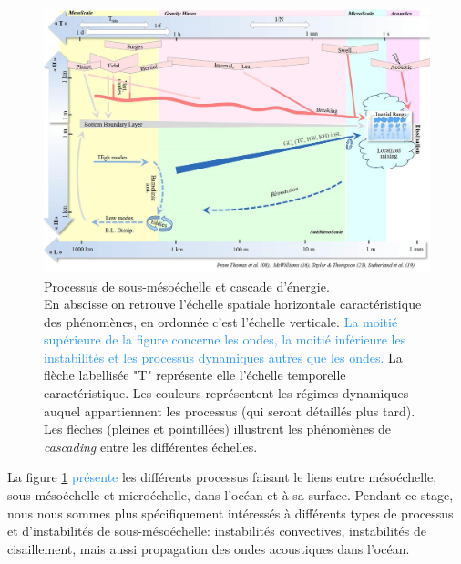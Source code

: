 \documentclass{rapportECC}
\newcommand{\FAadd}[1]{\textcolor{DodgerBlue}{{#1}}}                     %
\begin{document}
\begin{figure}[H]
    \centering
    \includegraphics[width=1
    \textwidth]{images/SMC.jpg}
    \caption{Processus de sous-mésoéchelle et cascade d'énergie. \\
    En abscisse on retrouve l'échelle spatiale horizontale caractéristique des phénomènes, en ordonnée c'est l'échelle verticale. \FAadd{La moitié supérieure de la figure concerne les ondes, la moitié inférieure les instabilités et les processus dynamiques autres que les ondes.} La flèche labellisée "T" représente elle l'échelle temporelle caractéristique. Les couleurs représentent les régimes dynamiques auquel appartiennent les processus (qui seront détaillés plus tard). Les flèches (pleines et pointillées) illustrent les phénomènes de \textit{cascading} entre les différentes échelles.}
    \label{fig:echelles}
\end{figure}

La figure \ref{fig:echelles} \FAadd{présente} les différents processus faisant le liens entre mésoéchelle, sous-mésoéchelle et microéchelle, dans l'océan et à sa surface. Pendant ce stage, nous nous sommes plus spécifiquement intéressés à différents types de processus et d'instabilités de sous-mésoéchelle: instabilités convectives, instabilités de cisaillement, mais aussi propagation des ondes acoustiques dans l'océan.
\\
\end{document}
